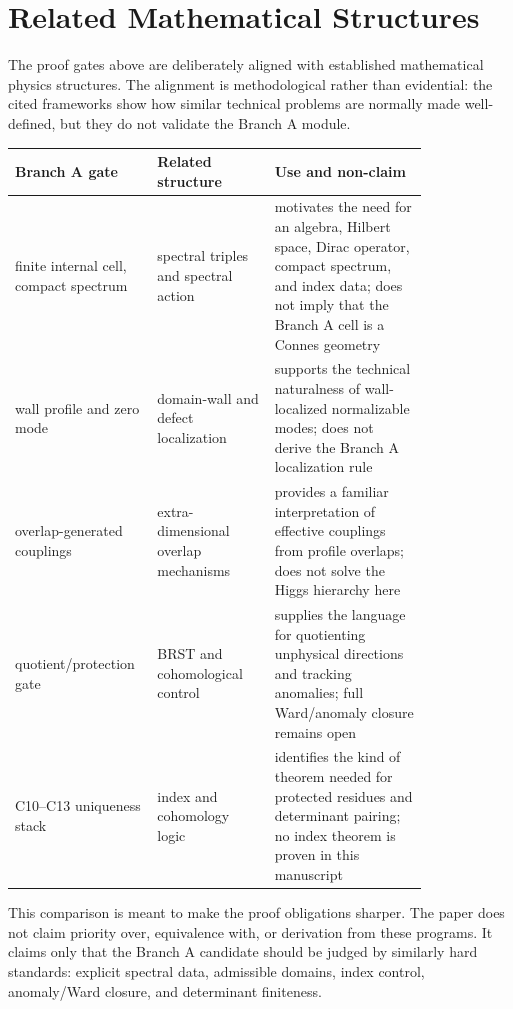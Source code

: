 \documentclass[11pt]{article}
\begin{document}
\section{Related Mathematical Structures}
The proof gates above are deliberately aligned with established mathematical
physics structures.  The alignment is methodological rather than evidential:
the cited frameworks show how similar technical problems are normally made
well-defined, but they do not validate the Branch A module.

\begin{center}
\begin{tabular}{p{0.22\linewidth}p{0.26\linewidth}p{0.34\linewidth}}
\toprule
\textbf{Branch A gate} & \textbf{Related structure} & \textbf{Use and non-claim}\\
\midrule
finite internal cell, compact spectrum & spectral triples and spectral action
\cite{Connes1996,ChamseddineConnes1997,ConnesMarcolli2006} & motivates the
need for an algebra, Hilbert space, Dirac operator, compact spectrum, and index
data; does not imply that the Branch A cell is a Connes geometry\\
wall profile and zero mode & domain-wall and defect localization
\cite{JackiwRebbi1976,RubakovShaposhnikov1983,Kaplan1992} & supports the
technical naturalness of wall-localized normalizable modes; does not derive the
Branch A localization rule\\
overlap-generated couplings & extra-dimensional overlap mechanisms
\cite{RandallSundrum1999} & provides a familiar interpretation of effective
couplings from profile overlaps; does not solve the Higgs hierarchy here\\
quotient/protection gate & BRST and cohomological control
\cite{Becchi1976,KugoOjima1979} & supplies the language for quotienting
unphysical directions and tracking anomalies; full Ward/anomaly closure remains
open\\
C10--C13 uniqueness stack & index and cohomology logic
\cite{Connes1996,ConnesMarcolli2006} & identifies the kind of theorem needed
for protected residues and determinant pairing; no index theorem is proven in
this manuscript\\
\bottomrule
\end{tabular}
\end{center}

This comparison is meant to make the proof obligations sharper.  The paper
does not claim priority over, equivalence with, or derivation from these
programs.  It claims only that the Branch A candidate should be judged by
similarly hard standards: explicit spectral data, admissible domains, index
control, anomaly/Ward closure, and determinant finiteness.
\end{document}
